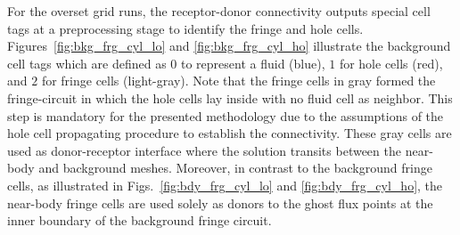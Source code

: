 For the overset grid runs, the receptor-donor connectivity outputs special cell tags at a preprocessing stage to identify the fringe and hole cells. Figures\ \ref{fig:bkg_frg_cyl_lo} and \ref{fig:bkg_frg_cyl_ho} illustrate the background  cell tags which are defined as $0$ to represent a fluid (blue), $1$ for hole cells (red), and $2$ for fringe cells (light-gray). Note that the fringe cells in gray formed the fringe-circuit in which the hole cells lay inside with no fluid cell as neighbor. This step is mandatory for the presented methodology due to the assumptions of the hole cell propagating procedure to establish the connectivity. These gray cells are used as donor-receptor interface where the solution transits between the near-body and background meshes. Moreover, in contrast to the background fringe cells, as illustrated in Figs.\ \ref{fig:bdy_frg_cyl_lo} and \ref{fig:bdy_frg_cyl_ho}, the near-body fringe cells are used solely as donors to the ghost flux points at the inner boundary of the background fringe circuit.
